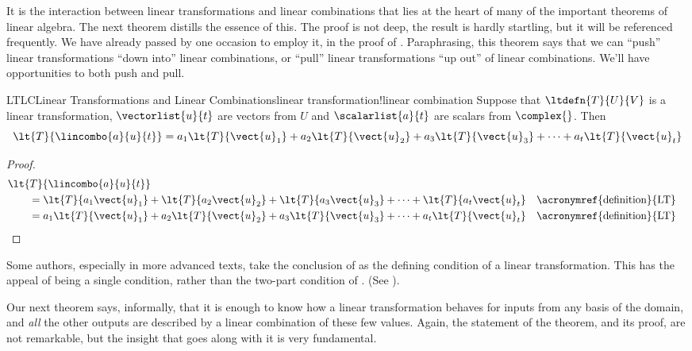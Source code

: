 %
%
It is the interaction between linear transformations and linear combinations that lies at the heart of many of the important theorems of linear algebra.  The next theorem distills the essence of this.  The proof is not deep, the result is hardly startling, but it will be referenced frequently.  We have already passed by one occasion to employ it, in the proof of .  Paraphrasing, this theorem says that we can ``push'' linear transformations ``down into'' linear combinations, or ``pull'' linear transformations ``up out'' of linear combinations.  We'll have opportunities to both push and pull.
%
\begin{theorem}{LTLC}{Linear Transformations and Linear Combinations}{linear transformation!linear combination}
Suppose that $\ltdefn{T}{U}{V}$ is a linear transformation, $\vectorlist{u}{t}$ are vectors from $U$ and $\scalarlist{a}{t}$ are scalars from $\complex{\null}$.  Then
%
\begin{equation*}
\lt{T}{\lincombo{a}{u}{t}}
=
a_1\lt{T}{\vect{u}_1}+
a_2\lt{T}{\vect{u}_2}+
a_3\lt{T}{\vect{u}_3}+\cdots+
a_t\lt{T}{\vect{u}_t}
\end{equation*}
%
\end{theorem}
%
\begin{proof}
%
\begin{align*}
&\lt{T}{\lincombo{a}{u}{t}}\\
&\quad\quad=
\lt{T}{a_1\vect{u}_1}+
\lt{T}{a_2\vect{u}_2}+
\lt{T}{a_3\vect{u}_3}+\cdots+
\lt{T}{a_t\vect{u}_t}&&\text{\acronymref{definition}{LT}}\\
&\quad\quad=
a_1\lt{T}{\vect{u}_1}+
a_2\lt{T}{\vect{u}_2}+
a_3\lt{T}{\vect{u}_3}+\cdots+
a_t\lt{T}{\vect{u}_t}&&\text{\acronymref{definition}{LT}}
\end{align*}
%
\end{proof}
%
Some authors, especially in more advanced texts, take the conclusion of  as the defining condition of a linear transformation.  This has the appeal of being a single condition, rather than the two-part condition of .  (See ).\par
%
Our next theorem says, informally, that it is enough to know how a linear transformation behaves for inputs from any basis of the domain, and {\em all} the other outputs are described by a linear combination of these few values.  Again, the statement of the theorem, and its proof, are not remarkable, but the insight that goes along with it is very fundamental.
